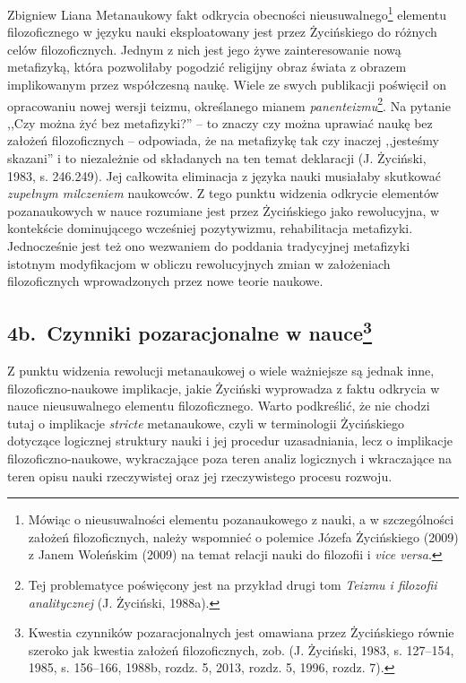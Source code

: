\begin{artplenv}{Zbigniew Liana}
Metanaukowy fakt odkrycia obecności nieusuwalnego\footnote{Mówiąc o nieusuwalności elementu
pozanaukowego z nauki, a w szczególności założeń filozoficznych,
należy wspomnieć o polemice Józefa Życińskiego \label{ref:RND1yIXITCd0q}(2009) z
Janem Woleńskim \label{ref:RNDgHTjy4YLsK}(2009) na temat relacji nauki do filozofii i \textit{vice versa}.} elementu
filozoficznego w języku nauki eksploatowany jest przez Życińskiego do różnych celów filozoficznych. Jednym z nich jest
jego żywe zainteresowanie nową metafizyką, która pozwoliłaby pogodzić religijny obraz świata z obrazem implikowanym
przez współczesną naukę. Wiele ze swych publikacji poświęcił on opracowaniu nowej wersji teizmu, określanego mianem
\textit{panenteizmu}\footnote{Tej problematyce poświęcony jest na przykład drugi tom \textit{Teizmu i filozofii
analitycznej} \label{ref:RNDIkjJ8iRdco}(J. Życiński, 1988a).}. Na pytanie ,,Czy można żyć bez metafizyki?'' -- to znaczy
czy można uprawiać naukę bez założeń filozoficznych -- odpowiada, że na metafizykę tak czy inaczej
,,jesteśmy skazani'' i to niezależnie od składanych na ten temat
deklaracji \label{ref:RNDBwmyHW0qHJ}(J. Życiński, 1983, s. 246.249).
Jej całkowita eliminacja z języka nauki musiałaby skutkować \textit{zupełnym milczeniem} naukowców. Z tego punktu widzenia
odkrycie elementów pozanaukowych w nauce rozumiane jest przez Życińskiego jako rewolucyjna, w kontekście dominującego
wcześniej pozytywizmu, rehabilitacja metafizyki. Jednocześnie jest też ono wezwaniem do poddania tradycyjnej metafizyki
istotnym modyfikacjom w obliczu rewolucyjnych zmian w założeniach filozoficznych wprowadzonych przez nowe teorie
naukowe. 

\subsection{4b.~Czynniki pozaracjonalne w nauce\footnote{Kwestia czynników pozaracjonalnych jest omawiana przez Życińskiego równie
szeroko jak kwestia założeń filozoficznych, zob. \label{ref:RND5w30wnfua2}(J. Życiński, 1983, s. 127–154, 1985, s. 156–166,
1988b, rozdz. 5, 2013, rozdz. 5, 1996, rozdz. 7).}}

Z punktu widzenia rewolucji metanaukowej o wiele ważniejsze są jednak inne, filozoficzno-naukowe implikacje, jakie
Życiński wyprowadza z faktu odkrycia w nauce nieusuwalnego elementu filozoficznego. Warto podkreślić, że nie chodzi
tutaj o implikacje \textit{stricte} metanaukowe, czyli w terminologii Życińskiego dotyczące logicznej struktury nauki i jej
procedur uzasadniania, lecz o implikacje filozoficzno-naukowe, wykraczające poza teren analiz
logicznych i wkraczające na teren opisu nauki rzeczywistej oraz jej rzeczywistego procesu rozwoju. 


\end{artplenv}
